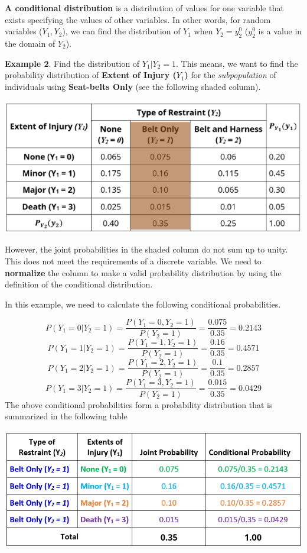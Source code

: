 \documentclass[
]{book}
\begin{document}
\textbf{A conditional distribution} is a distribution of values for one variable that exists specifying the values of other variables. In other words, for random variables (\(Y_1, Y_2\)), we can find the distribution of \(Y_1\) when \(Y_2 = y_2^0\) (\(y_2^0\) is a value in the domain of \(Y_2\)).

\textbf{Example 2}. Find the distribution of \(Y_1|Y_2 = 1\). This means, we want to find the probability distribution of \textbf{Extent of Injury (\(Y_1\))} for the \emph{subpopulation} of individuals using \textbf{Seat-belts Only} (see the following shaded column).

\begin{center}\includegraphics[width=0.65\linewidth]{topic07/example2TwoWayTableCondDist} \end{center}

However, the joint probabilities in the shaded column do not sum up to unity. This does not meet the requirements of a discrete variable. We need to \textbf{normalize} the column to make a valid probability distribution by using the definition of the conditional distribution.

In this example, we need to calculate the following conditional probabilities.

\[
P(Y_1=0|Y_2 = 1) = \frac{P(Y_1 =0, Y_2=1)}{P(Y_2=1)} = \frac{0.075}{0.35}= 0.2143
\]
\[
P(Y_1=1|Y_2 = 1) = \frac{P(Y_1 =1, Y_2=1)}{P(Y_2=1)} = \frac{0.16}{0.35} = 0.4571
\]
\[
P(Y_1=2|Y_2 = 1) = \frac{P(Y_1 =2, Y_2=1)}{P(Y_2=1)} = \frac{0.1}{0.35}=0.2857
\]
\[
P(Y_1=3|Y_2 = 1) = \frac{P(Y_1 =3, Y_2=1)}{P(Y_2=1)} = \frac{0.015}{0.35}=0.0429
\]
The above conditional probabilities form a probability distribution that is summarized in the following table

\begin{center}\includegraphics[width=0.65\linewidth]{topic07/example2TwoWayTableCondDist01} \end{center}
\end{document}

